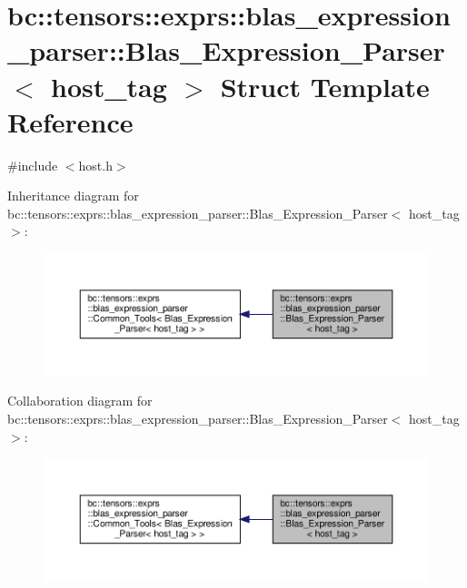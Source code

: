\hypertarget{structbc_1_1tensors_1_1exprs_1_1blas__expression__parser_1_1Blas__Expression__Parser_3_01host__tag_01_4}{}\section{bc\+:\+:tensors\+:\+:exprs\+:\+:blas\+\_\+expression\+\_\+parser\+:\+:Blas\+\_\+\+Expression\+\_\+\+Parser$<$ host\+\_\+tag $>$ Struct Template Reference}
\label{structbc_1_1tensors_1_1exprs_1_1blas__expression__parser_1_1Blas__Expression__Parser_3_01host__tag_01_4}


{\ttfamily \#include $<$host.\+h$>$}



Inheritance diagram for bc\+:\+:tensors\+:\+:exprs\+:\+:blas\+\_\+expression\+\_\+parser\+:\+:Blas\+\_\+\+Expression\+\_\+\+Parser$<$ host\+\_\+tag $>$\+:\nopagebreak
\begin{figure}[H]
\begin{center}
\leavevmode
\includegraphics[width=350pt]{structbc_1_1tensors_1_1exprs_1_1blas__expression__parser_1_1Blas__Expression__Parser_3_01host__tag_01_4__inherit__graph}
\end{center}
\end{figure}


Collaboration diagram for bc\+:\+:tensors\+:\+:exprs\+:\+:blas\+\_\+expression\+\_\+parser\+:\+:Blas\+\_\+\+Expression\+\_\+\+Parser$<$ host\+\_\+tag $>$\+:\nopagebreak
\begin{figure}[H]
\begin{center}
\leavevmode
\includegraphics[width=350pt]{structbc_1_1tensors_1_1exprs_1_1blas__expression__parser_1_1Blas__Expression__Parser_3_01host__tag_01_4__coll__graph}
\end{center}
\end{figure}
